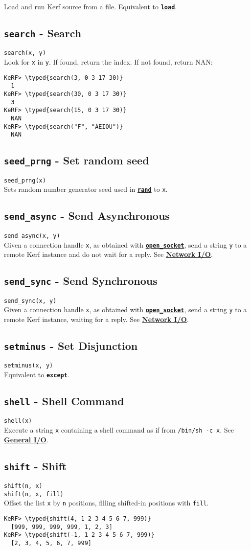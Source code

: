 \documentclass{article}
\newcommand{\typed}[1]{\textcolor{TealBlue}{#1}}
\newcommand{\primdefu}[3]{\subsection{\texttt{#1} - #2}\label{prim:#3}}
\newcommand{\primu}[2]{\hyperref[prim:#2]{\textbf{\texttt{#1}}}}
\newcommand{\primdef}[2]{\primdefu{#1}{#2}{#1}}
\newcommand{\prim}[1]{\primu{#1}{#1}}
\begin{document}
Load and run Kerf source from a file. Equivalent to \prim{load}.

\pagebreak
\primdef{search}{Search}
\texttt{search(x, y)}\\

Look for \texttt{x} in \texttt{y}. If found, return the index. If not found, return NAN:
\begin{Verbatim}
KeRF> \typed{search(3, 0 3 17 30)}
  1
KeRF> \typed{search(30, 0 3 17 30)}
  3
KeRF> \typed{search(15, 0 3 17 30)}
  NAN
KeRF> \typed{search("F", "AEIOU")}
  NAN
\end{Verbatim}

\primdefu{seed\_prng}{Set random seed}{seedPrng}
\texttt{seed\_prng(x)}\\

Sets random number generator seed used in \prim{rand} to \texttt{x}.


\primdefu{send\_async}{Send Asynchronous}{sendAsync}
\texttt{send\_async(x, y)}\\

Given a connection handle \texttt{x}, as obtained with \primu{open\_socket}{openSocket}, send a string \texttt{y} to a remote Kerf instance and do not wait for a reply. See \hyperref[sec:netio]{\textbf{Network I/O}}.

\primdefu{send\_sync}{Send Synchronous}{sendSync}
\texttt{send\_sync(x, y)}\\

Given a connection handle \texttt{x}, as obtained with \primu{open\_socket}{openSocket}, send a string \texttt{y} to a remote Kerf instance, waiting for a reply. See \hyperref[sec:netio]{\textbf{Network I/O}}.

\primdef{setminus}{Set Disjunction}
\texttt{setminus(x, y)}\\

Equivalent to \prim{except}.

\primdef{shell}{Shell Command}
\texttt{shell(x)}\\

Execute a string \texttt{x} containing a shell command as if from \texttt{/bin/sh -c x}. See \hyperref[sec:genio]{\textbf{General I/O}}.

\pagebreak
\primdef{shift}{Shift}
\texttt{shift(n, x)}\\
\texttt{shift(n, x, fill)}\\

Offset the list \texttt{x} by \texttt{n} positions, filling shifted-in positions with \texttt{fill}.
\begin{Verbatim}
KeRF> \typed{shift(4, 1 2 3 4 5 6 7, 999)}
  [999, 999, 999, 999, 1, 2, 3]
KeRF> \typed{shift(-1, 1 2 3 4 5 6 7, 999)}
  [2, 3, 4, 5, 6, 7, 999]
\end{Verbatim}
\end{document}

